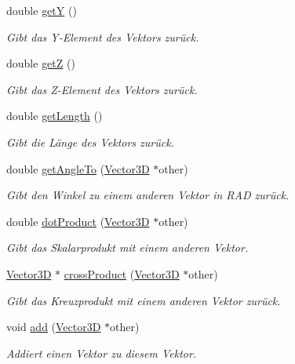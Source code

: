 \begin{DoxyCompactItemize}
double \hyperlink{classVector3D_aa3ffff17b886274a58417dfe4bb4c4a2}{get\-Y} ()
\begin{DoxyCompactList}\small\item\em Gibt das Y-\/\-Element des Vektors zurück. \end{DoxyCompactList}\item 
double \hyperlink{classVector3D_ab0dcbf253ff78856eccb5ea74d080fc7}{get\-Z} ()
\begin{DoxyCompactList}\small\item\em Gibt das Z-\/\-Element des Vektors zurück. \end{DoxyCompactList}\item 
double \hyperlink{classVector3D_a2e3aa1d244483abcb1a8e48e47e79512}{get\-Length} ()
\begin{DoxyCompactList}\small\item\em Gibt die Länge des Vektors zurück. \end{DoxyCompactList}\item 
double \hyperlink{classVector3D_a4bf1dcea68296f2f38f3574242933153}{get\-Angle\-To} (\hyperlink{classVector3D}{Vector3\-D} $\ast$other)
\begin{DoxyCompactList}\small\item\em Gibt den Winkel zu einem anderen Vektor in R\-A\-D zurück. \end{DoxyCompactList}\item 
double \hyperlink{classVector3D_a0808a8e6004a347d82f9214778b5968f}{dot\-Product} (\hyperlink{classVector3D}{Vector3\-D} $\ast$other)
\begin{DoxyCompactList}\small\item\em Gibt das Skalarprodukt mit einem anderen Vektor. \end{DoxyCompactList}\item 
\hyperlink{classVector3D}{Vector3\-D} $\ast$ \hyperlink{classVector3D_a482cd77ce44ea7dd71fd7a43cb7b1cf5}{cross\-Product} (\hyperlink{classVector3D}{Vector3\-D} $\ast$other)
\begin{DoxyCompactList}\small\item\em Gibt das Kreuzprodukt mit einem anderen Vektor zurück. \end{DoxyCompactList}\item 
void \hyperlink{classVector3D_a0d14ff1f789254ff90adc22628eb8347}{add} (\hyperlink{classVector3D}{Vector3\-D} $\ast$other)
\begin{DoxyCompactList}\small\item\em Addiert einen Vektor zu diesem Vektor. \end{DoxyCompactList}\item 

\end{DoxyCompactItemize}
